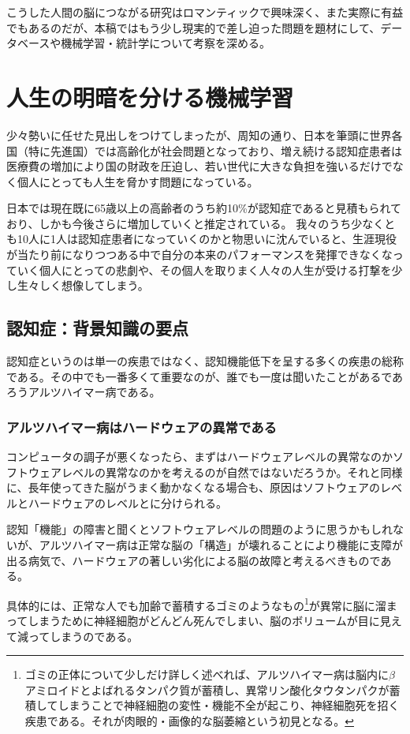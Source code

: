 こうした人間の脳につながる研究はロマンティックで興味深く、また実際に有益でもあるのだが、本稿ではもう少し現実的で差し迫った問題を題材にして、データベースや機械学習・統計学について考察を深める。

\section{人生の明暗を分ける機械学習}
少々勢いに任せた見出しをつけてしまったが、周知の通り、日本を筆頭に世界各国（特に先進国）では高齢化が社会問題となっており、増え続ける認知症患者は医療費の増加により国の財政を圧迫し、若い世代に大きな負担を強いるだけでなく個人にとっても人生を脅かす問題になっている。

日本では現在既に65歳以上の高齢者のうち約10\%が認知症であると見積もられており、しかも今後さらに増加していくと推定されている。
我々のうち少なくとも10人に1人は認知症患者になっていくのかと物思いに沈んでいると、生涯現役が当たり前になりつつある中で自分の本来のパフォーマンスを発揮できなくなっていく個人にとっての悲劇や、その個人を取りまく人々の人生が受ける打撃を少し生々しく想像してしまう。

\subsection{認知症：背景知識の要点}
認知症というのは単一の疾患ではなく、認知機能低下を呈する多くの疾患の総称である。その中でも一番多くて重要なのが、誰でも一度は聞いたことがあるであろうアルツハイマー病である。

\subsubsection{アルツハイマー病はハードウェアの異常である}
コンピュータの調子が悪くなったら、まずはハードウェアレベルの異常なのかソフトウェアレベルの異常なのかを考えるのが自然ではないだろうか。それと同様に、長年使ってきた脳がうまく動かなくなる場合も、原因はソフトウェアのレベルとハードウェアのレベルとに分けられる。

認知「機能」の障害と聞くとソフトウェアレベルの問題のように思うかもしれないが、アルツハイマー病は正常な脳の「構造」が壊れることにより機能に支障が出る病気で、ハードウェアの著しい劣化による脳の故障と考えるべきものである。

具体的には、正常な人でも加齢で蓄積するゴミのようなもの\footnote{ゴミの正体について少しだけ詳しく述べれば、アルツハイマー病は脳内に$\beta$アミロイドとよばれるタンパク質が蓄積し、異常リン酸化タウタンパクが蓄積してしまうことで神経細胞の変性・機能不全が起こり、神経細胞死を招く疾患である。それが肉眼的・画像的な脳萎縮という初見となる。}が異常に脳に溜まってしまうために神経細胞がどんどん死んでしまい、脳のボリュームが目に見えて減ってしまうのである。

